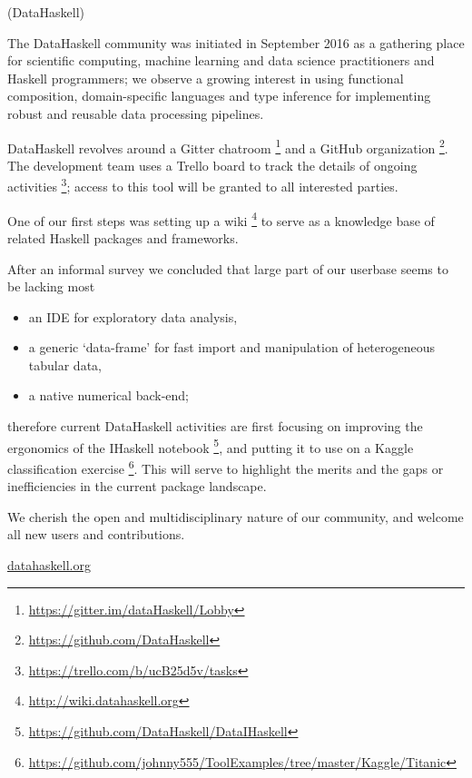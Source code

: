 \documentclass[DIV16,twocolumn,10pt]{scrreprt}
\begin{document}
\begin{hcarentry}{(DataHaskell)}
\makeheader

The DataHaskell community was initiated in September 2016 as a gathering place for scientific computing, machine learning and data science practitioners and Haskell programmers; we observe a growing interest in using functional composition, domain-specific languages and type inference for implementing robust and reusable data processing pipelines.


DataHaskell revolves around a Gitter chatroom \footnote{\url{https://gitter.im/dataHaskell/Lobby}} and a GitHub organization \footnote{\url{https://github.com/DataHaskell}}. The development team uses a Trello board to track the details of ongoing activities \footnote{\url{https://trello.com/b/ucB25d5v/tasks}}; access to this tool will be granted to all interested parties.

One of our first steps was setting up a wiki \footnote{\url{http://wiki.datahaskell.org}} to serve as a knowledge base of related Haskell packages and frameworks.

After an informal survey we concluded that large part of our userbase seems to be lacking most
\begin{itemize} 
\item an IDE for exploratory data analysis,
\item a generic `data-frame' for fast import and manipulation of heterogeneous tabular data,
\item a native numerical back-end;
\end{itemize}
therefore current DataHaskell activities are first focusing on improving the ergonomics of the IHaskell notebook \footnote{\url{https://github.com/DataHaskell/DataIHaskell}}, and putting it to use on a Kaggle classification exercise \footnote{\url{https://github.com/johnny555/ToolExamples/tree/master/Kaggle/Titanic}}. This will serve to highlight the merits and the gaps or inefficiencies in the current package landscape.

We cherish the open and multidisciplinary nature of our community, and welcome all new users and contributions.

\FurtherReading
  \url{datahaskell.org}
\end{hcarentry}
\end{document}
